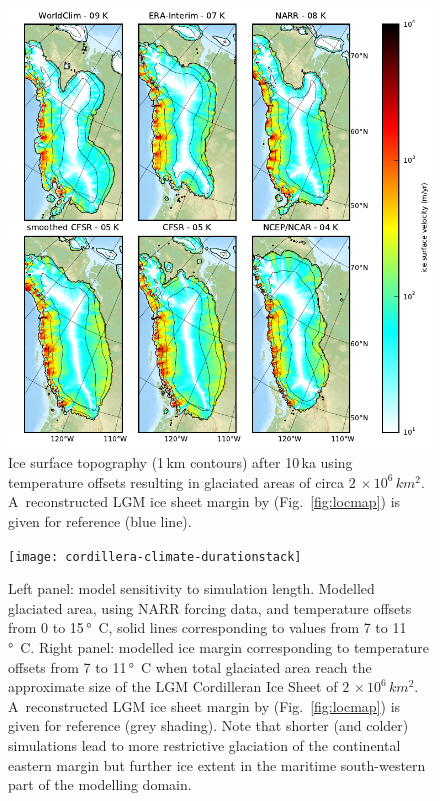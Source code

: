 \documentclass[tc, ms]{copernicus}
\begin{document}
\begin{figure}[t]
	\vspace*{2mm}
	\begin{center}
		\includegraphics{cordillera-climate-best}
	\end{center}
	\caption{Ice surface topography (1\,km contours) after 10\,ka using temperature offsets resulting in glaciated areas of circa $2\,\times10^6\,\unit{km^2}$. A~reconstructed LGM ice sheet margin by \citet{dyke-2004} (Fig.~\ref{fig:locmap}) is given for reference (blue line).}
	\label{fig:best}
\end{figure}

\begin{figure}[t]
	\vspace*{2mm}
	\begin{center}
		\texttt{[image: cordillera-climate-durationstack]}
	\end{center}
	\caption{Left panel: model sensitivity to simulation length. Modelled glaciated area, using NARR forcing data, and temperature offsets from 0 to 15\,\unit{\degree C}, solid lines corresponding to values from 7 to 11\,\unit{\degree C}. Right panel: modelled ice margin corresponding to temperature offsets from 7 to 11\,\unit{\degree C} when total glaciated area reach the approximate size of the LGM Cordilleran Ice Sheet of $2\,\times10^6\,\unit{km^2}$. A~reconstructed LGM ice sheet margin by \citet{dyke-2004} (Fig.~\ref{fig:locmap}) is given for reference (grey shading). Note that shorter (and colder) simulations lead to more restrictive glaciation of the continental eastern margin but further ice extent in the maritime south-western part of the modelling domain.}
	\label{fig:durationstack}
\end{figure}

\end{document}
